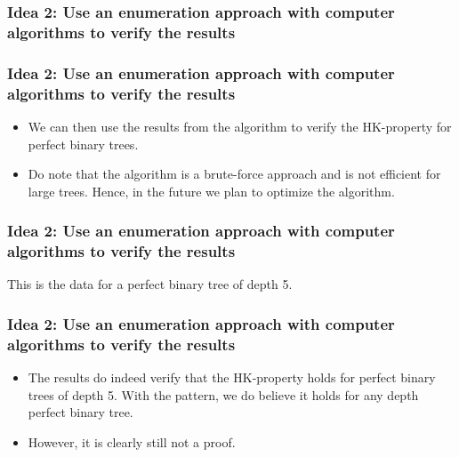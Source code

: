 \documentclass[10pt,]{beamer}
\theoremstyle{conjectureStyle}
\theoremstyle{notationStyle}
\begin{document}
\begin{frame}\frametitle{Idea 2: Use an enumeration approach with computer algorithms to verify the results}
    \begin{algorithm}[H]


    \end{algorithm}
\end{frame}

\begin{frame}\frametitle{Idea 2: Use an enumeration approach with computer algorithms to verify the results}
    \begin{itemize}
        \item We can then use the results from the algorithm to verify the HK-property for perfect binary trees.
        \item Do note that the algorithm is a brute-force approach and is not efficient for large trees. Hence, in the future we plan to optimize the algorithm.
    \end{itemize}
\end{frame}


\begin{frame}\frametitle{Idea 2: Use an enumeration approach with computer algorithms to verify the results}
    This is the data for a perfect binary tree of depth 5.
    \centering
\end{frame}

\begin{frame}\frametitle{Idea 2: Use an enumeration approach with computer algorithms to verify the results}
    \begin{itemize}
        \item The results do indeed verify that the HK-property holds for perfect binary trees of depth 5. With the pattern, we do believe it holds for any depth perfect binary tree.
        \item However, it is clearly still not a proof.
    \end{itemize}
\end{frame}
\end{document}
